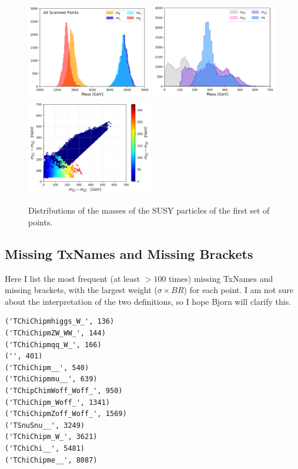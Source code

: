 \documentclass[a4paper,11pt]{article}
\begin{document}
\begin{figure}[!b]
	\centering
	\subfigure
	{ \includegraphics[width=0.49\textwidth]{Fig/Res/Coloured.png}}
	\subfigure
	{\includegraphics[width=0.49\textwidth]{Fig/Res/EW.png}}
	\subfigure
    {\includegraphics[width=0.49\textwidth]{Fig/Res/Diff_EW.png}}	
	\caption{Distributions of the masses of the SUSY particles of the first set of points.}
	\label{masses}
\end{figure}

\clearpage
\subsection{Missing TxNames and Missing Brackets}
Here I list the most frequent (at least $> 100$ times) missing TxNames and missing brackets, with the largest weight ($\sigma \times BR$) for each point. I am not sure about the interpretation of the two definitions, so I hope Bjorn will clarify this.

\begin{verbatim}
('TChiChipmhiggs_W_', 136)
('TChiChipmZW_WW_', 144)
('TChiChipmqq_W_', 166)
('', 401)
('TChiChipm__', 540)
('TChiChipmmu__', 639)
('TChipChimWoff_Woff_', 950)
('TChiChipm_Woff_', 1341)
('TChiChipmZoff_Woff_', 1569)
('TSnuSnu__', 3249)
('TChiChipm_W_', 3621)
('TChiChi__', 5481)
('TChiChipme__', 8087)
\end{verbatim}
\end{document}
